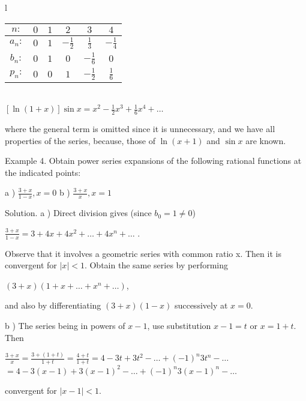 \documentclass[11pt]{amsbook}
\begin{document}

\begin{center}
	\begin{tabular}{l}
	\begin{tabular}{c c c c c c}
		$n  : $ & $0$ & $1$ & $2$ & $3$ & $4$ \\
		\midrule
		$a_n :$ & $0$ & $1$ & $-\frac{1}{2}$ & $\frac{1}{3}$ & $-\frac{1}{4}$
		\\
		$b_n : $ & $0$ & $1$ & $0$ & $-\frac{1}{6}$ & $0$ \\
		\midrule
		$p_n : $ & $0$ & $0$ & $1$ & $-\frac{1}{2}$ & $\frac{1}{6}$
	\end{tabular}
	\\
	$[\ln(1+x)]\sin x = x^2 - \frac{1}{2}x^3 + \frac{1}{6}x^4 + \ldots$
\end{tabular}
\end{center}

\noindent
where the general term is omitted since it is unnecessary, and we have all properties of the series, because, those of $\ln(x+1)$ and $\sin x$ are known.

Example 4. Obtain power series expansions of the following rational functions at the indicated points:
		
	a ) $\frac{3+x}{1-x} , x = 0$ 
	b ) $\frac{3+x}{x} , x = 1$
	
Solution.
	\newline
	a ) Direct division gives (since $b_0 = 1 \neq 0$)

	\begin{center}
		$\frac{3+x}{1-x} = 3 + 4x + 4x^2 + \ldots + 4x^n + \ldots$ .
	\end{center}

\noindent
Observe that it involves a geometric series with common ratio x. Then it is convergent for $|x|<1$.
\newline
	Obtain the same series by performing
	\begin{center}
		$(3 + x)(1 + x + \ldots + x^n + \ldots)$,
	\end{center}
\noindent
and also by differentiating $(3+x)(1-x)$ successively at $x = 0$.

b ) The series being in powers of  $x - 1$, use substitution $x - 1 = t$ or $x = 1 + t$. Then
\begin{center}
	$\frac{3+x}{x} = \frac{3+(1+t)}{1+t} = \frac{4+t}{1+t} = 4 - 3t + 3t^2 - \ldots + (-1)^n 3t^n - \ldots$
	\newline
	$= 4 - 3(x-1) + 3(x-1)^2 - \ldots + (-1)^n 3(x-1)^n - \ldots$
\end{center}
\noindent
convergent for $|x-1|<1$.

\end{document}
